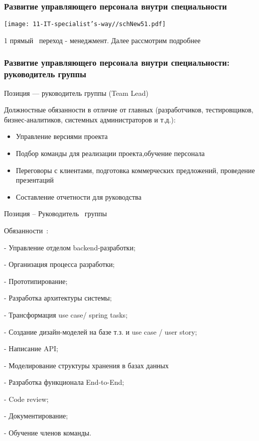 \documentclass{../industrial-development}
\begin{document}
\begin{frame} \frametitle{Развитие управляющего персонала внутри специальности}
  \centerline{\texttt{[image: 11-IT-specialist's-way//schNew51.pdf]}}
\end{frame}
\lecturenotes

 1 прямый~\cite{mc} переход  -  менеджмент. Далее рассмотрим подробнее



\begin{frame} \frametitle{Развитие управляющего персонала внутри специальности: руководитель группы}
 \begin{block}{}
  \alert{Позиция --- руководитель группы (Team Lead)}

Должностные обязанности в отличие от главных (разработчиков, тестировщиков, бизнес-аналитиков, системных администраторов и т.д.): 
  \end{block}
  \begin{itemize}
  \item Управление версиями проекта
  \item Подбор команды для реализации проекта,обучение персонала
 \item  Переговоры с клиентами, подготовка коммерческих предложений, проведение презентаций
  \item Составление отчетности для руководства
  \end{itemize}
\end{frame}

\lecturenotes

Позиция – Руководитель~\cite{hh} группы~\cite{itcf}

Обязанности~\cite{rab}:

- Управление отделом backend-разработки;

- Организация процесса разработки;

- Прототипирование;

- Разработка архитектуры системы;

- Трансформация use case/ spring tasks;

- Создание дизайн-моделей на базе т.з. и use case / user story;

- Написание API;

- Моделирование структуры хранения в базах данных

- Разработка функционала End-to-End;

- Code review;

- Документирование;

- Обучение членов команды.
\end{document}
